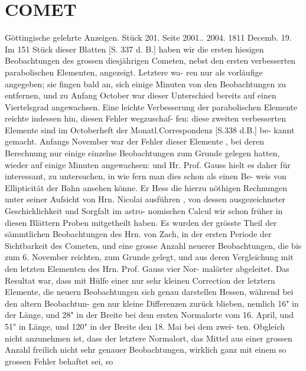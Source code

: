 \documentclass[12pt,a4paper]{article}
\begin{document}
\section*{COMET}
Göttingische  gelehrte  Anzeigen.     Stück  201.  Seite  2001..  2004.     1811  Decemb.  19. 
Im  151  Stück  dieser  Blatten  [S.  337  d.  B.]  haben  wir  die  ersten  hiesigen  Beobachtungen  des  grossen 
diesjährigen  Cometen,  nebst  den  ersten  verbesserten  parabolischen  Elementen,  angezeigt.  Letztere  wa- 
ren nur  als  vorläufige  angegeben;  sie  fingen  bald  an,  sich  einige  Minuten  von  den  Beobachtungen  zu 
entfernen,  und  zu  Anfang  October  war  dieser  Unterschied  bereits  auf  einen  Viertelsgrad  angewachsen. 
Eine  leichte  Verbesserung  der  parabolischen  Elemente  reichte  indessen  hin,  diesen  Fehler  wegzuschaf- 
fen: diese  zweiten  verbesserten  Elemente  sind  im  Octoberheft  der  Monatl.Correspondenz  [S.338  d.B.]  be- 
kannt gemacht.  Anfangs  November  war  der  Fehler  dieser  Elemente ,  bei  deren  Berechnung  nur  einige 
einzelne  Beobachtungen  zum  Grunde  gelegen  hatten,  wieder  auf  einige  Minuten  angewachsen:  und  Hr. 
Prof.  Gauss  hielt  es  daher  für  interessant,  zu  untersuchen,  in  wie  fern  man  dies  schon  als  einen  Be- 
weis von  Ellipticität  der  Bahn  ansehen  könne.  Er  Hess  die  hierzu  nöthigen  Rechnungen  unter  seiner 
Aufsicht  von  Hrn.  Nicolai  ausführen ,  von  dessen  ausgezeichneter  Geschicklichkeit  und  Sorgfalt  im  astro- 
nomischen Calcul  wir  schon  früher  in  diesen  Blättern  Proben  mitgetheilt  haben.  Es  wurden  der  grösste 
Theil  der  sämmtlichen  Beobachtungen  des  Hrn.  von  Zach,  in  der  ersten  Periode  der  Sichtbarkeit  des 
Cometen,  und  eine  grosse  Anzahl  neuerer  Beobachtungen,  die  bis  zum  6.  November  reichten,  zum 
Grunde  gelegt,  und  aus  deren  Vergleichung  mit  den  letzten  Elementen  des  Hrn.  Prof.  Gauss  vier  Nor- 
malörter  abgeleitet.  Das  Resultat  war,  dass  mit  Hülfe  einer  nur  sehr  kleinen  Correction  der  letztern 
Elemente,  die  neuern  Beobachtungen  sich  genau  darstellen  Hessen,  während  bei  den  altern  Beobachtun- 
gen nur  kleine  Differenzen  zurück  blieben,  nemlich  16"  in  der  Länge,  und  28"  in  der  Breite  bei  dem 
ersten  Normalorte  vom  16.  April,  und  51"  in  Länge,  und  120"  in  der  Breite  den  18.  Mai  bei  dem  zwei- 
ten. Obgleich  nicht  anzunehmen  ist,  dass  der  letztere  Normalort,  das  Mittel  aus  einer  grossen  Anzahl 
freilich  nicht  sehr  genauer  Beobachtungen,  wirklich  ganz  mit  einem  so  grossen  Fehler  behaftet  sei,  so 
\end{document}
